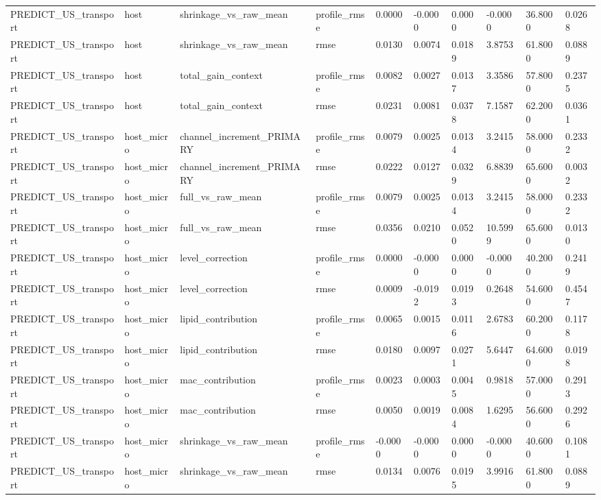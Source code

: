{\begin{longtable}{llllllllll}
PREDICT\_US\_transport & host & shrinkage\_vs\_raw\_mean & profile\_rmse & 0.0000 & -0.0000 & 0.0000 & -0.0000 & 36.8000 & 0.0268 \\
PREDICT\_US\_transport & host & shrinkage\_vs\_raw\_mean & rmse & 0.0130 & 0.0074 & 0.0189 & 3.8753 & 61.8000 & 0.0889 \\
PREDICT\_US\_transport & host & total\_gain\_context & profile\_rmse & 0.0082 & 0.0027 & 0.0137 & 3.3586 & 57.8000 & 0.2375 \\
PREDICT\_US\_transport & host & total\_gain\_context & rmse & 0.0231 & 0.0081 & 0.0378 & 7.1587 & 62.2000 & 0.0361 \\
PREDICT\_US\_transport & host\_micro & channel\_increment\_PRIMARY & profile\_rmse & 0.0079 & 0.0025 & 0.0134 & 3.2415 & 58.0000 & 0.2332 \\
PREDICT\_US\_transport & host\_micro & channel\_increment\_PRIMARY & rmse & 0.0222 & 0.0127 & 0.0329 & 6.8839 & 65.6000 & 0.0032 \\
PREDICT\_US\_transport & host\_micro & full\_vs\_raw\_mean & profile\_rmse & 0.0079 & 0.0025 & 0.0134 & 3.2415 & 58.0000 & 0.2332 \\
PREDICT\_US\_transport & host\_micro & full\_vs\_raw\_mean & rmse & 0.0356 & 0.0210 & 0.0520 & 10.5999 & 65.6000 & 0.0130 \\
PREDICT\_US\_transport & host\_micro & level\_correction & profile\_rmse & 0.0000 & -0.0000 & 0.0000 & -0.0000 & 40.2000 & 0.2419 \\
PREDICT\_US\_transport & host\_micro & level\_correction & rmse & 0.0009 & -0.0192 & 0.0193 & 0.2648 & 54.6000 & 0.4547 \\
PREDICT\_US\_transport & host\_micro & lipid\_contribution & profile\_rmse & 0.0065 & 0.0015 & 0.0116 & 2.6783 & 60.2000 & 0.1178 \\
PREDICT\_US\_transport & host\_micro & lipid\_contribution & rmse & 0.0180 & 0.0097 & 0.0271 & 5.6447 & 64.6000 & 0.0198 \\
PREDICT\_US\_transport & host\_micro & mac\_contribution & profile\_rmse & 0.0023 & 0.0003 & 0.0045 & 0.9818 & 57.0000 & 0.2913 \\
PREDICT\_US\_transport & host\_micro & mac\_contribution & rmse & 0.0050 & 0.0019 & 0.0084 & 1.6295 & 56.6000 & 0.2926 \\
PREDICT\_US\_transport & host\_micro & shrinkage\_vs\_raw\_mean & profile\_rmse & -0.0000 & -0.0000 & 0.0000 & -0.0000 & 40.6000 & 0.1081 \\
PREDICT\_US\_transport & host\_micro & shrinkage\_vs\_raw\_mean & rmse & 0.0134 & 0.0076 & 0.0195 & 3.9916 & 61.8000 & 0.0889 \\

\end{longtable}}
